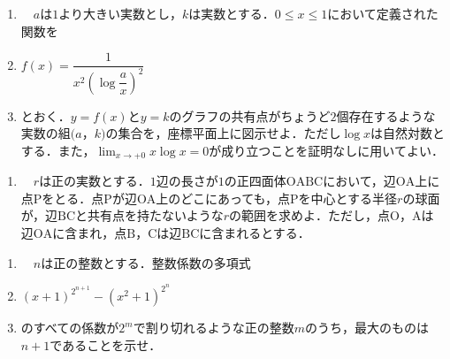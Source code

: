 \documentclass[a4paper]{ltjsarticle}
\begin{document}




\noindent
\begin{enumerate}
        \begin{enumerate}
        \item[] 　$a$は$1$より大きい実数とし，$k$は実数とする．$0\le{x}\le{1}$において定義された関数を
        \item[] \hspace{2cm}$f(x)=\dfrac{1}{x^2\left(\log{\dfrac{a}{x}}\right)^2}$
        \item[] とおく．$y=f(x)$と$y=k$のグラフの共有点がちょうど$2$個存在するような実数の組$(a$，$k)$の集合を，座標平面上に図示せよ．ただし$\log{x}$は自然対数とする．また，$\displaystyle\lim_{x\rightarrow{+0}}x\log{x}=0$が成り立つことを証明なしに用いてよい．
        \end{enumerate}
\end{enumerate}\vspace{10truemm}

\begin{enumerate}
        \begin{enumerate}
        \item[] 　$r$は正の実数とする．$1$辺の長さが$1$の正四面体$\mathrm{OABC}$において，辺$\mathrm{OA}$上に点$\mathrm{P}$をとる．点$\mathrm{P}$が辺$\mathrm{OA}$上のどこにあっても，点$\mathrm{P}$を中心とする半径$r$の球面が，辺$\mathrm{BC}$と共有点を持たないような$r$の範囲を求めよ．ただし，点$\mathrm{O}$，$\mathrm{A}$は辺$\mathrm{OA}$に含まれ，点$\mathrm{B}$，$\mathrm{C}$は辺$\mathrm{BC}$に含まれるとする．
        \end{enumerate}
\end{enumerate}\vspace{10truemm}

\begin{enumerate}
        \begin{enumerate}
        \item[] 　$n$は正の整数とする．整数係数の多項式
        \item[] \hspace{2cm}$(x+1)^{2^{n+1}}-(x^2+1)^{2^n}$
        \item[] のすべての係数が$2^m$で割り切れるような正の整数$m$のうち，最大のものは$n+1$であることを示せ．
        \end{enumerate}
\end{enumerate}\vspace{10truemm}
\end{document}
